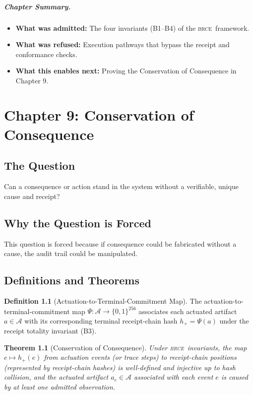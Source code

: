 \documentclass[11pt,oneside]{book}
\theoremstyle{definition}
\newtheorem{definition}{Definition}[chapter]
\theoremstyle{plain}
\newtheorem{theorem}{Theorem}[chapter]
\theoremstyle{remark}
\newcommand{\Act}{\mathcal{A}}                 %
\newcommand{\BRCE}{\textsc{brce}}
\begin{document}
\paragraph{Chapter Summary.}
\begin{itemize}
  \item \textbf{What was admitted:} The four invariants (B1–B4) of the \BRCE\ framework. %
  \item \textbf{What was refused:} Execution pathways that bypass the receipt and conformance checks. %
  \item \textbf{What this enables next:} Proving the Conservation of Consequence in Chapter 9. %
\end{itemize}

\chapter{Chapter 9: Conservation of Consequence}
\label{ch:conservation}

\section{The Question}
Can a consequence or action stand in the system without a verifiable, unique cause and receipt? %

\section{Why the Question is Forced}
This question is forced because if consequence could be fabricated without a cause, the audit trail could be manipulated. %

\section{Definitions and Theorems}

\begin{definition}[Actuation-to-Terminal-Commitment Map]\label{def:Psi_map}
The actuation-to-terminal-commitment map $\Psi: \Act \to \{0,1\}^{256}$ associates each actuated artifact $a \in \Act$ with its corresponding terminal receipt-chain hash $h_+ = \Psi(a)$ under the receipt totality invariant (B3). %
\end{definition}

\begin{theorem}[Conservation of Consequence]\label{thm:conservation_theorem}
Under \BRCE\ invariants, the map $e \mapsto h_+(e)$ from actuation events (or trace steps) to receipt-chain positions (represented by receipt-chain hashes) is well-defined and injective up to hash collision, and the actuated artifact $a_e \in \Act$ associated with each event $e$ is caused by at least one admitted observation. %
\end{theorem}
\end{document}

